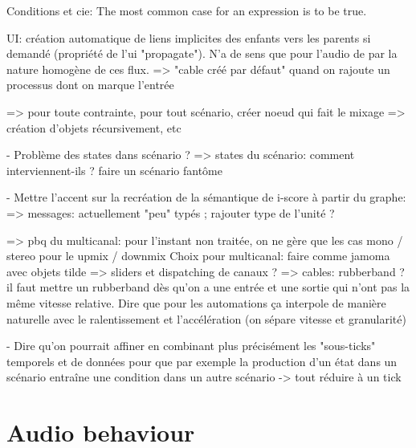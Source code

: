 \documentclass[applsci,article,submit,moreauthors,pdftex,10pt,a4paper]{mdpi}
\begin{document}
Conditions et cie: The most common case for an expression is to be true.

UI: création automatique de liens implicites des enfants vers les parents si demandé (propriété de l'ui "propagate").
N'a de sens que pour l'audio de par la nature homogène de ces flux.
=> "cable créé par défaut" quand on rajoute un processus dont on marque l'entrée

=> pour toute contrainte, pour tout scénario, créer noeud qui fait le mixage
=> création d'objets récursivement, etc

- Problème des states dans scénario ?
=> states du scénario: comment interviennent-ils ? faire un scénario fantôme 


- Mettre l'accent sur la recréation de la sémantique de i-score à partir du graphe: 
=> messages: actuellement "peu" typés ; rajouter type de l'unité ? 

=> pbq du multicanal: pour l'instant non traitée, on ne gère que les cas mono / stereo pour le upmix / downmix
Choix pour multicanal: faire comme jamoma avec objets tilde
=> sliders et dispatching de canaux ?
=> cables: rubberband ? il faut mettre un rubberband dès qu'on a une entrée et une sortie qui n'ont pas la même vitesse relative. Dire que pour les automations ça interpole de manière naturelle avec le ralentissement et l'accélération (on sépare vitesse et granularité)


- Dire qu'on pourrait affiner en combinant plus précisément les "sous-ticks" temporels et de données
pour que par exemple la production d'un état dans un scénario entraîne une condition dans un autre scénario -> tout réduire à un tick


\section{Audio behaviour}
\end{document}
